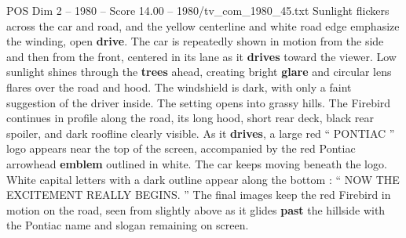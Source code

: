 \begin{textsample}{POS Dim 2 – 1980 – Score 14.00 – 1980/tv\_com\_1980\_45.txt}
Sunlight flickers across the car and road, and the yellow centerline and white road edge emphasize the winding, open \textbf{drive}.
The car is repeatedly shown in motion from the side and then from the front, centered in its lane as it \textbf{drives} toward the viewer.
Low sunlight shines through the \textbf{trees} ahead, creating bright \textbf{glare} and circular lens flares over the road and hood.
The windshield is dark, with only a faint suggestion of the driver inside.
The setting opens into grassy hills.
The Firebird continues in profile along the road, its long hood, short rear deck, black rear spoiler, and dark roofline clearly visible.
As it \textbf{drives}, a large red “ PONTIAC ” logo appears near the top of the screen, accompanied by the red Pontiac arrowhead \textbf{emblem} outlined in white.
The car keeps moving beneath the logo.
White capital letters with a dark outline appear along the bottom : “ NOW THE EXCITEMENT REALLY BEGINS. ” The final images keep the red Firebird in motion on the road, seen from slightly above as it glides \textbf{past} the hillside with the Pontiac name and slogan remaining on screen.

\end{textsample}
